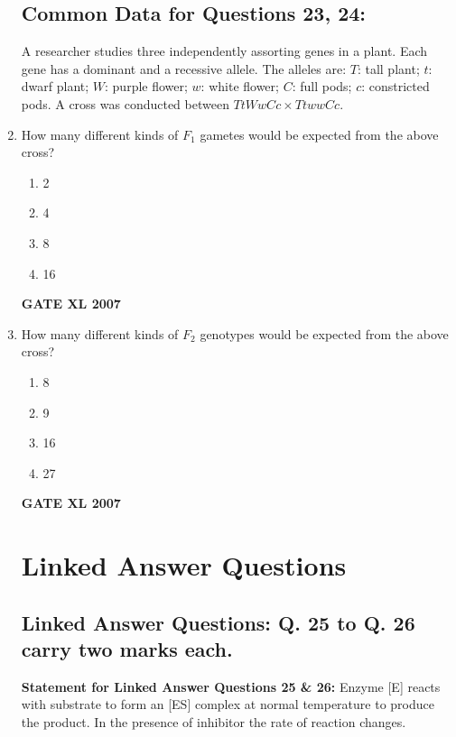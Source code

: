 \documentclass[journal,12pt,onecolumn]{IEEEtran}
\begin{document}
\begin{enumerate}
\subsection*{Common Data for Questions 23, 24:}
A researcher studies three independently assorting genes in a plant. Each gene has a dominant and a recessive allele. The alleles are: $T$: tall plant; $t$: dwarf plant; $W$: purple flower; $w$: white flower; $C$: full pods; $c$: constricted pods. A cross was conducted between $TtWwCc \times TtwwCc$.

\vspace{1em} %

\item How many different kinds of $F_1$ gametes would be expected from the above cross?
\begin{enumerate}
    \item 2
    \item 4
    \item 8
    \item 16
\end{enumerate}

\hfill{\textbf{GATE XL 2007}}
\item How many different kinds of $F_2$ genotypes would be expected from the above cross?
\begin{enumerate}
    \item 8
    \item 9
    \item 16
    \item 27
\end{enumerate}\hfill{\textbf{GATE XL 2007}}

\vspace{2em}

\section*{Linked Answer Questions}
\subsection*{Linked Answer Questions: Q. 25 to Q. 26 carry two marks each.}

\textbf{Statement for Linked Answer Questions 25 \& 26:}
Enzyme [E] reacts with substrate  to form an [ES] complex at normal temperature to produce the product. In the presence of inhibitor the rate of reaction changes.


\end{enumerate}
\end{document}

